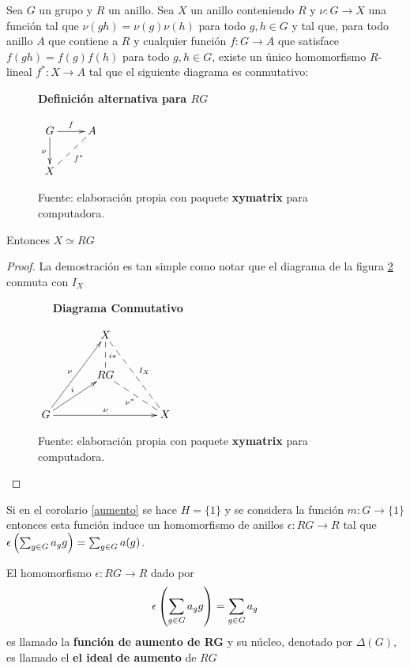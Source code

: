 \begin{proposicion}
Sea $G$ un grupo y $R$ un anillo. Sea $X$ un anillo conteniendo $R$ y $\nu \colon G \to X$ una función tal que $\nu (gh) = \nu(g)\nu(h)$ para todo $g,h \in G$ y tal que, para todo anillo $A$ que contiene a $R$ y cualquier función $f \colon G \to A$ que satisface $f(gh) = f(g)f(h)$ para todo $g, h \in G$, existe un único homomorfismo $R$-lineal $f^* \colon X \to A$ tal que el siguiente diagrama es conmutativo: 

\begin{figure}[h!]
\caption{\quad \textbf{Definición alternativa para $RG$}}
\centering
$\xymatrix { G \ar[r]^f 
\ar[d]_{\nu}
 & A\\
X \ar@{ --}[ru]_{f^*} & }$
\caption*{Fuente: elaboración propia con paquete \textbf{xymatrix} para computadora.}
\label{fig:alternativa para RG}
\end{figure}


Entonces $X \simeq RG$
\end{proposicion}


\begin{proof}
La demostración es tan simple como notar que el  diagrama de la figura \ref{fig:categorias} conmuta con $I_X$

\begin{figure}[h!]
\caption{$\quad$ \textbf{Diagrama Conmutativo}}
\centering
$\xymatrix @!0 @R=3pc @C=4.5pc { & X \ar@{--}[d]^{i*} \ar@{ --}^{I_X}[ddr] \\ & RG \ar@{--}_{\nu^*}[rd] & \\ G \ar[ruu]^{\nu} \ar[ru]^{i} \ar[rr]^{\nu}& & X}$
\caption*{Fuente: elaboración propia con paquete \textbf{xymatrix} para computadora.}
\label{fig:categorias}
\end{figure}

 
\qedhere
\end{proof}

\begin{nota}
Si en el corolario \ref{aumento} se hace $H=\{1\}$ y se considera la función $m \colon G \to \{1\}$ entonces esta función induce un homomorfismo de anillos $\epsilon \colon RG \to R$ tal que $\epsilon\left(\sum_{g \in G} a_{g} g\right) = \sum_{g \in G} a(g)$. 
\end{nota}

\begin{definicion}
El homomorfismo $\epsilon \colon RG \to R$ dado por \[ \epsilon \left( \sum_{g \in G} a_{g} g\right) = \sum_{g \in G}a_g \] es llamado la \textbf{ función de aumento de RG} y su núcleo, denotado por $\Delta (G)$, es llamado el \textbf{el ideal de aumento} de $RG$
\end{definicion}



